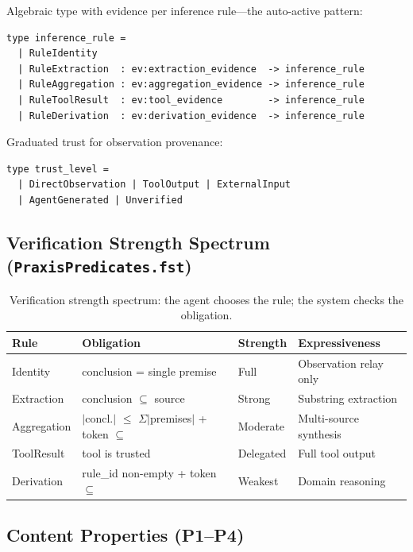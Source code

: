 \documentclass[sigplan,screen,nonacm]{acmart}
\begin{document}
Algebraic type with evidence per inference rule---the auto-active pattern:

\begin{lstlisting}[language=fstar,caption={Inference rule algebraic type with per-variant evidence.},label={lst:rule}]
type inference_rule =
  | RuleIdentity
  | RuleExtraction  : ev:extraction_evidence  -> inference_rule
  | RuleAggregation : ev:aggregation_evidence -> inference_rule
  | RuleToolResult  : ev:tool_evidence        -> inference_rule
  | RuleDerivation  : ev:derivation_evidence  -> inference_rule
\end{lstlisting}

Graduated trust for observation provenance:

\begin{lstlisting}[language=fstar,caption={Trust levels for observation sources.},label={lst:trust}]
type trust_level =
  | DirectObservation | ToolOutput | ExternalInput
  | AgentGenerated | Unverified
\end{lstlisting}

\subsection{Verification Strength Spectrum (\texttt{PraxisPredicates.fst})}

\begin{table}[t]
\caption{Verification strength spectrum: the agent chooses the rule; the system checks the obligation.}
\label{tab:spectrum}
\small
\begin{tabular}{@{}llll@{}}
\toprule
\textbf{Rule} & \textbf{Obligation} & \textbf{Strength} & \textbf{Expressiveness} \\
\midrule
Identity    & conclusion = single premise   & Full     & Observation relay only \\
Extraction  & conclusion $\subseteq$ source & Strong   & Substring extraction \\
Aggregation & $|$concl.$|$ $\leq$ $\Sigma|$premises$|$ + token $\subseteq$ & Moderate & Multi-source synthesis \\
ToolResult  & tool is trusted               & Delegated & Full tool output \\
Derivation  & rule\_id non-empty + token $\subseteq$ & Weakest & Domain reasoning \\
\bottomrule
\end{tabular}
\end{table}

\subsection{Content Properties (P1--P4)}
\end{document}
